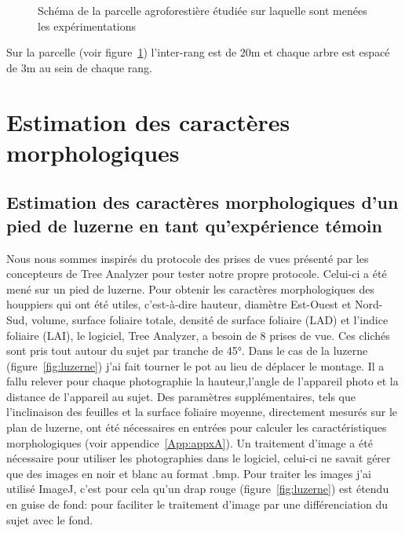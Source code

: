 \documentclass[12pt]{report}
\begin{document}
\begin{figure}
  \centering
  \def\svgwidth{\linewidth}
  
  \caption{Schéma de la parcelle agroforestière étudiée sur laquelle sont
  menées les expérimentations\label{fig:parcelle}}
\end{figure}

Sur la parcelle (voir figure~\ref{fig:parcelle}) l'inter-rang est de 20m et chaque arbre est
espacé de 3m au sein de chaque rang.



\section{Estimation des caractères morphologiques}


\subsection{Estimation des caractères morphologiques d'un pied de luzerne en tant qu'expérience témoin}

Nous nous sommes inspirés du protocole des prises de vues présenté par les
concepteurs de Tree Analyzer \citep{MAR_ref24, MAR_ref25} pour tester notre
propre protocole. Celui-ci a été mené sur un pied de luzerne. Pour 
obtenir les caractères morphologiques des houppiers qui ont été utiles,
c'est-à-dire hauteur, diamètre Est-Ouest et Nord-Sud, volume, surface foliaire
totale, densité de surface foliaire (LAD) et l'indice foliaire (LAI), le
logiciel, Tree Analyzer, a besoin de 8 prises de vue. Ces clichés sont
pris tout autour du sujet par tranche de 45°. Dans le
cas de la luzerne (figure~\ref{fig:luzerne}) j'ai fait tourner le pot au
lieu de déplacer le montage. Il a fallu relever pour chaque photographie la
hauteur,l'angle de l'appareil photo et la distance de l'appareil au sujet. Des
paramètres supplémentaires, tels que l'inclinaison des feuilles et la surface
foliaire moyenne, directement mesurés sur le plan de luzerne, ont été
nécessaires en entrées pour calculer les caractéristiques morphologiques (voir appendice~\ref{App:appxA}). 
Un traitement d'image a été nécessaire pour 
utiliser les photographies dans le logiciel, celui-ci ne savait gérer que des
images en noir et blanc au format .bmp. Pour traiter les images j'ai 
utilisé ImageJ\cite{ImageJ_ref39}, c'est pour cela qu'un drap rouge (figure~\ref{fig:luzerne})
est étendu en guise de fond: pour faciliter le traitement d'image par une
différenciation du sujet avec le fond.
\end{document}
